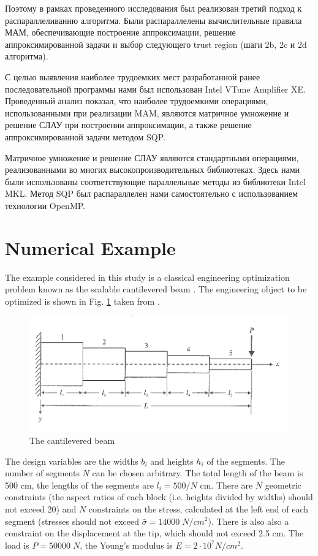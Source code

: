 \documentclass[runningheads,a4paper]{llncs}
\begin{document}
Поэтому в рамках проведенного исследования был реализован третий подход к распараллеливанию алгоритма. Были распараллелены вычислительные правила МАМ, обеспечивающие построение аппроксимации, решение аппроксимированной задачи и выбор следующего trust region (шаги 2b, 2c и 2d алгоритма).

С целью выявления наиболее трудоемких мест разработанной ранее последовательной программы нами был использован Intel VTune Amplifier XE. Проведенный анализ показал, что наиболее трудоемкими операциями, использованными при реализации MAM, являются матричное умножение и решение СЛАУ при построении аппроксимации, а также решение аппроксимированной задачи методом SQP.

Матричное умножение и решение СЛАУ являются стандартными операциями, реализованными во многих высокопроизводительных библиотеках. Здесь нами были использованы соответствующие параллельные методы из библиотеки Intel MKL. Метод SQP был распараллелен нами самостоятельно с использованием технологии OpenMP.

\section{Numerical Example}
\label{sec:num_example}

The example considered in this study is a classical engineering optimization problem known as the scalable cantilevered beam \cite{Vanderpllaats2001}. The engineering object to be optimized is shown in Fig. \ref{fig:beam} taken from \cite{Vanderpllaats2001}.

\begin{figure}[ht]
    \centering
    \includegraphics[width=1.0\textwidth]{beam.png}
    \caption{The cantilevered beam}
    \label{fig:beam}
\end{figure}

The design variables are the widths $b_i$ and heights $h_i$ of the segments. The number of segments $N$ can be chosen arbitrary. The total length of the beam is 500 cm, the lengths of the segments are $l_i=500/N$  cm. There are $N$ geometric constraints (the aspect ratios of each block (i.e. heights divided by widths) should not exceed 20) and $N$ constraints on the stress, calculated at the left end of each segment (stresses should not exceed  $\bar{\sigma}=14000\; N/cm^2$). There is also also a constraint on the displacement at the tip, which should not exceed 2.5 cm. The load is $P = 50 000\; N$, the Young's modulus is $E=2\cdot 10^7  N/cm^2$.
\end{document}
